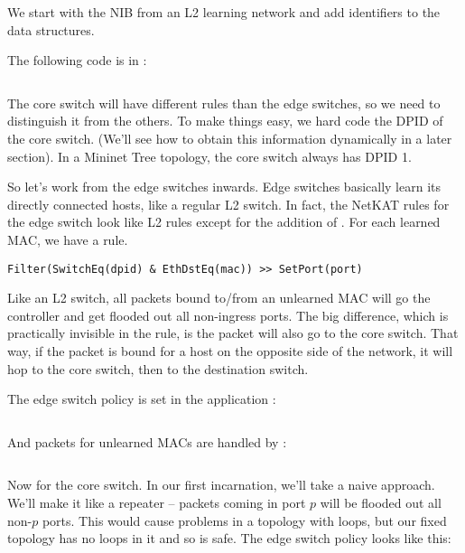 We start with the NIB from an L2 learning network and add  identifiers to the data
structures.

The following code is in  :

\inputminted{python}{code/multiswitch_topologies/network_information_base.py}

The core switch will have different rules than the edge switches, so we need to distinguish it
from the others.  To make things easy, we hard code the DPID of the core switch.  (We'll see 
how to obtain this information dynamically in a later section).  In a Mininet Tree topology,
the core switch always has DPID 1.  

So let's work from the edge switches inwards.  Edge switches basically learn its directly
connected hosts, like a regular L2 switch.  In fact, the NetKAT rules for the edge switch 
look like L2 rules except for the addition of .  For each learned MAC, we have a rule.

\begin{verbatim}
Filter(SwitchEq(dpid) & EthDstEq(mac)) >> SetPort(port) 
\end{verbatim}

Like an L2 switch, all packets bound to/from an unlearned MAC will go the controller and get flooded
out all non-ingress ports.  The big difference, which is practically invisible in the rule, is
the packet will also go to the core switch.  That way, if the packet is bound for a host on the 
opposite side of the network, it will hop to the core switch, then to the destination switch.  

The edge switch policy is set in the application :

\inputminted[firstline=22,lastline=40]{python}{code/multiswitch_topologies/multiswitch1.py}

And packets for unlearned MACs are handled by :

\inputminted[firstline=56,lastline=80]{python}{code/multiswitch_topologies/multiswitch1.py}

Now for the core switch.  In our first incarnation, we'll take a naive approach.  We'll make it like
a repeater -- packets coming in port $p$ will be flooded out all non-$p$ ports.  This would cause problems
in a topology with loops, but our fixed topology has no loops in it and so is safe.  The edge
switch policy looks like this:

